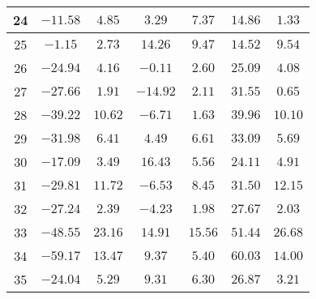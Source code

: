 \begin{table}[H]
\begin{tabular}{|c|c|c|c|c|c|c|}
                        24  &   $-11.58$  &  $4.85$   &   $3.29$    &  $7.37$  &  $14.86$   &  $1.33$   \\ \hline
                        25  &   $-1.15$   &  $2.73$   &   $14.26$   &  $9.47$  &  $14.52$   &  $9.54$   \\ \hline
                        26  &   $-24.94$  &  $4.16$   &   $-0.11$   &  $2.60$  &  $25.09$   &  $4.08$   \\ \hline
                        27  &   $-27.66$  &  $1.91$   &   $-14.92$  &  $2.11$  &  $31.55$   &  $0.65$   \\ \hline
                        28  &   $-39.22$  &  $10.62$  &   $-6.71$   &  $1.63$  &  $39.96$   &  $10.10$  \\ \hline
                        29  &   $-31.98$  &  $6.41$   &   $4.49$    &  $6.61$  &  $33.09$   &  $5.69$   \\ \hline
                        30  &   $-17.09$  &  $3.49$   &   $16.43$   &  $5.56$  &  $24.11$   &  $4.91$   \\ \hline
                        31  &   $-29.81$  &  $11.72$  &   $-6.53$   &  $8.45$  &  $31.50$   &  $12.15$  \\ \hline
                        32  &   $-27.24$  &  $2.39$   &   $-4.23$   &  $1.98$  &  $27.67$   &  $2.03$   \\ \hline
                        33  &   $-48.55$  &  $23.16$  &   $14.91$   &  $15.56$ &  $51.44$   &  $26.68$  \\ \hline
                        34  &   $-59.17$  &  $13.47$  &   $9.37$    &  $5.40$  &  $60.03$   &  $14.00$  \\ \hline
                        35  &   $-24.04$  &  $5.29$   &   $9.31$    &  $6.30$  &  $26.87$   &  $3.21$   \\ \hline
        \end{tabular}
    \label{tab:media_lab_4_aleatoria} 
\end{table}

